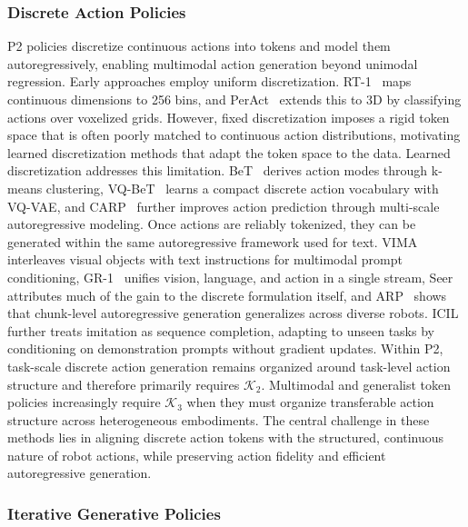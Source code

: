 \documentclass[acmsmall,screen,review]{acmart}
\begin{document}
\subsubsection{Discrete Action Policies}\label{sec:discrete_action_policies}

P2 policies discretize continuous actions into tokens and model them autoregressively, enabling multimodal action generation beyond unimodal regression.
Early approaches employ uniform discretization. 
RT-1~\cite{brohan2023rt1} maps continuous dimensions to 256 bins, and PerAct~\cite{shridhar2022peract} extends this to 3D by classifying actions over voxelized grids.
However, fixed discretization imposes a rigid token space that is often poorly matched to continuous action distributions, motivating learned discretization methods that adapt the token space to the data.
Learned discretization addresses this limitation. BeT~\cite{shafiullah2022bet} derives action modes through k-means clustering, VQ-BeT~\cite{lee2024vqbet} learns a compact discrete action vocabulary with VQ-VAE, and CARP~\cite{gong2025carp} further improves action prediction through multi-scale autoregressive modeling.
Once actions are reliably tokenized, they can be generated within the same autoregressive framework used for text. VIMA~\cite{jiang2023vima} interleaves visual objects with text instructions for multimodal prompt conditioning, GR-1~\cite{wu2023gr1} unifies vision, language, and action in a single stream, Seer~\cite{tian2024seer} attributes much of the gain to the discrete formulation itself, and ARP~\cite{zhang2025arp} shows that chunk-level autoregressive generation generalizes across diverse robots. ICIL~\cite{fu2025icil} further treats imitation as sequence completion, adapting to unseen tasks by conditioning on demonstration prompts without gradient updates.
Within P2, task-scale discrete action generation remains organized around task-level action structure and therefore primarily requires \(\mathcal{K}_2\). Multimodal and generalist token policies increasingly require \(\mathcal{K}_3\) when they must organize transferable action structure across heterogeneous embodiments.
The central challenge in these methods lies in aligning discrete action tokens with the structured, continuous nature of robot actions, while preserving action fidelity and efficient autoregressive generation.

\subsubsection{Iterative Generative Policies}\label{sec:iterative_generative_policies}
\end{document}
